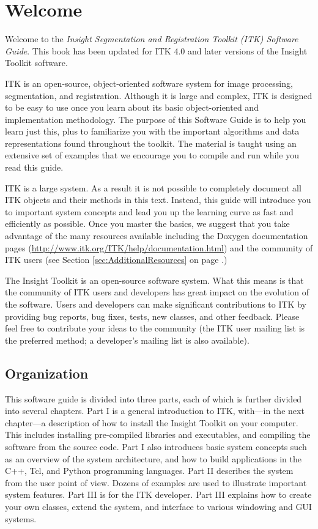 \chapter{Welcome}
\label{chapter:Introduction}

Welcome to the \emph{Insight Segmentation and Registration Toolkit (ITK)
Software Guide}. This book has been updated for ITK 4.0 and later versions of
the Insight Toolkit software.

ITK is an open-source, object-oriented software system for image processing,
segmentation, and registration.  Although it is large and complex, ITK is
designed to be easy to use once you learn about its basic object-oriented and
implementation methodology. The purpose of this Software Guide is
to help you learn just this, plus to familiarize you with the important
algorithms and data representations found throughout the toolkit. The material
is taught using an extensive set of examples that we encourage you to compile
and run while you read this guide.

ITK is a large system. As a result it is not possible to completely document
all ITK objects and their methods in this text. Instead, this guide will
introduce you to important system concepts and lead you up the learning curve
as fast and efficiently as possible. Once you master the basics, we suggest
that you take advantage of the many resources available including the Doxygen
documentation pages (\url{http://www.itk.org/ITK/help/documentation.html}) and
the community of ITK users (see Section \ref{sec:AdditionalResources} on page
\pageref{sec:AdditionalResources}.)

The Insight Toolkit is an open-source software system. What this means
is that the community of ITK users and developers has great impact on the
evolution of the software. Users and developers can make significant
contributions to ITK by providing bug reports, bug fixes, tests, new classes,
and other feedback. Please feel free to contribute your ideas to the
community (the ITK user mailing list is the preferred method; a developer's
mailing list is also available).

\section{Organization}
\label{sec:Organization}

This software guide is divided into three parts, each of which is further
divided into several chapters. Part I is a general introduction to ITK,
with---in the next chapter---a description of how to install the Insight
Toolkit on your computer. This includes installing pre-compiled libraries and
executables, and compiling the software from the source code. Part I also
introduces basic system concepts such as an overview of the system
architecture, and how to build applications in the C++, Tcl, and Python programming
languages. Part II describes the system from the user point of view. Dozens
of examples are used to illustrate important system features. Part III is for
the ITK developer. Part III explains how to create your own classes, extend
the system, and interface to various windowing and GUI systems.


